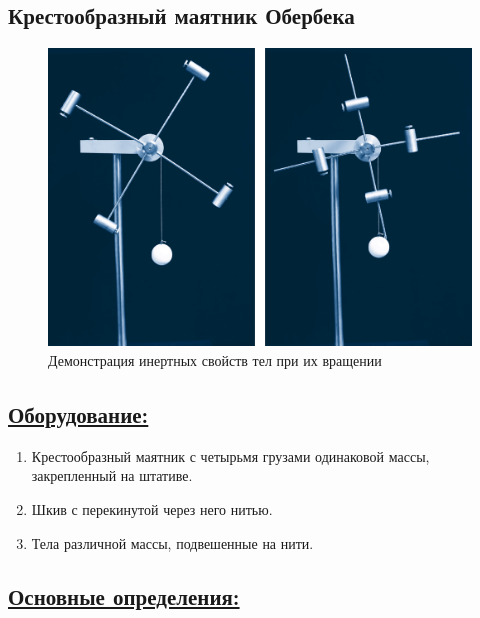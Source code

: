 \documentclass[14pt,a4paper,oneside]{extarticle}	%
\begin{document}
	
	\begin{center}
		\subsection*{Крестообразный маятник Обербека}
	\end{center}
	
	\begin{figure}[H] 	
		\centering 	
		\includegraphics[width=0.9\linewidth]{oberbeck-1.png}
		\caption{Демонстрация инертных свойств тел при их вращении}
		\label{oberbeck-1}
	\end{figure}
	
	\subsection*{\underline{Оборудование:}}
	
	\begin{enumerate} 
		\item Крестообразный маятник с четырьмя грузами одинаковой массы, закрепленный на штативе.
		\item Шкив с перекинутой через него нитью.
		\item Тела различной массы, подвешенные на нити.
	\end{enumerate}

	\subsection*{\underline{Основные определения:}}
	
\end{document}
